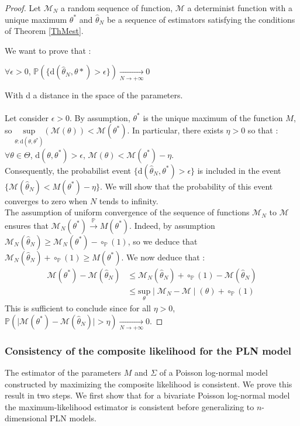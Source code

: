 \documentclass[11pt, a4paper]{article}
\begin{document}
\begin{proof}
Let $\mathcal{M}_N$ a random sequence of function, $\mathcal{M}$ a determinist function with a unique maximum $\theta^*$ and $\widehat{\theta}_N$ be a sequence of estimators satisfying the conditions of  Theorem \ref{ThMest}.

We want to prove that :
\begin{center}
$\forall \epsilon > 0$, $\mathbb{P}(\{\mathrm{d}(\widehat{\theta}_N,\theta*)>\epsilon\})\underset{ N \rightarrow + \infty}{\longrightarrow} 0$
\end{center}
With d a distance in the space of the parameters.\\
\\
Let consider $\epsilon >0$. By assumption, $\theta ^*$ is the unique maximum of the function $M$, so $\underset{ \theta : \mathrm{d}(\theta,\theta^*)}{\mathrm{sup}}(\mathcal{M}(\theta)) < \mathcal{M}(\theta^*)$. In particular, there exists $\eta > 0$ so that : $\forall \theta \in \Theta$, $\mathrm{d}(\theta,\theta^*)>\epsilon$, $\mathcal{M}(\theta) < \mathcal{M}(\theta^*)-\eta$.\\
Consequently, the probabilist event $\{\mathrm{d}(\widehat{\theta}_N,\theta^*)> \epsilon\}$ is included in the event $\{\mathcal{M}(\widehat{\theta}_N)<M(\theta^*)-\eta\}$. We will show that the probability of this event converges to zero when $N$ tends to infinity.\\
The assumption of uniform convergence of the sequence of functions $\mathcal{M}_N$  to $\mathcal{M}$ ensures that $\mathcal{M}_N(\theta^*) \overset{\mathbb{P}}{\longrightarrow} M(\theta^*)$. Indeed, by assumption $\mathcal{M}_N( \widehat{\theta}_N) \geq \mathcal{M}_N(\theta^*)- \circ_\mathbb{P}(1)$, so we deduce that $\mathcal{M}_N( \widehat{\theta}_N)+ \circ_\mathbb{P}(1) \geq M(\theta^*)$.
We now deduce that :
\begin{align*}
\mathcal{M}(\theta^*)-\mathcal{M}(\widehat{\theta}_N) & \leq \mathcal{M}_N(\widehat{\theta}_N)+ \circ_\mathbb{P}(1)-\mathcal{M}(\widehat{\theta}_N)\\
& \leq \underset{\theta}{\mathrm{sup}} \mid \mathcal{M}_N-\mathcal{M} \mid (\theta) + \circ_\mathbb{P}(1)
\end{align*}
This is sufficient to conclude since for all $\eta > 0$, $\mathbb{P} ( \mid \mathcal{M}(\theta^*)-\mathcal{M}(\widehat{\theta}_N)\mid > \eta) \underset{ N \rightarrow + \infty} {\longrightarrow} 0$.
\end{proof}
\subsubsection{Consistency of the composite likelihood for the PLN model}
The estimator of the parameters $M$ and $\Sigma$ of a Poisson log-normal model constructed by maximizing the composite likelihood is consistent. We prove this result in two steps. We first show that for a bivariate Poisson log-normal model the maximum-likelihood estimator is consistent before generalizing to $n$-dimensional PLN models.
\end{document}
